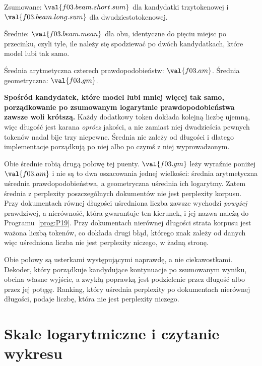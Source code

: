 \begin{fr}
\begin{ansblock}
Zsumowane: $\val{f03.beam.short.sum}$ dla kandydatki trzytokenowej i
$\val{f03.beam.long.sum}$ dla dwudziestotokenowej.

Średnie: $\val{f03.beam.mean}$ dla obu, identyczne do pięciu miejsc po
przecinku, czyli tyle, ile należy się spodziewać po dwóch kandydatkach, które
model lubi tak samo.

Średnia arytmetyczna czterech prawdopodobieństw: $\val{f03.am}$. Średnia
geometryczna: $\val{f03.gm}$.
\end{ansblock}

\textbf{Spośród kandydatek, które model lubi mniej więcej tak samo,
porządkowanie po zsumowanym logarytmie prawdopodobieństwa zawsze woli
krótszą.} Każdy dodatkowy token dokłada kolejną liczbę ujemną, więc długość
jest karana \emph{oprócz} jakości, a nie zamiast niej \dash{} dwadzieścia
pewnych tokenów nadal bije trzy niepewne. Średnia nie zależy od długości i
dlatego implementacje porządkują po niej albo po czymś z niej wyprowadzonym.

Obie średnie robią drugą połowę tej puenty. $\val{f03.gm}$ leży wyraźnie
poniżej $\val{f03.am}$ i nie są to dwa oszacowania jednej wielkości: średnia
arytmetyczna uśrednia prawdopodobieństwa, a geometryczna uśrednia ich
logarytmy. Zatem średnia z perplexity poszczególnych dokumentów nie jest
perplexity korpusu. Przy dokumentach równej długości uśredniona liczba zawsze
wychodzi \emph{powyżej} prawdziwej, a nierówność, która gwarantuje ten kierunek,
i jej nazwa należą do Programu~\ref{prog:P19}. Przy dokumentach nierównej
długości strata korpusu jest ważona liczbą tokenów, co dokłada drugi błąd,
którego znak zależy od danych \dash{} więc uśredniona liczba nie jest
perplexity niczego, w żadną stronę.

\begin{aibox}
Obie połowy są usterkami występującymi naprawdę, a nie ciekawostkami. Dekoder,
który porządkuje kandydujące kontynuacje po zsumowanym wyniku, obcina własne
wyjście, a zwykłą poprawką jest podzielenie przez długość albo przez jej
potęgę. Ranking, który uśrednia perplexity po dokumentach nierównej długości,
podaje liczbę, która nie jest perplexity niczego.
\end{aibox}
\end{fr}

\section{Skale logarytmiczne i czytanie wykresu}
\label{sec:F03-scales}

